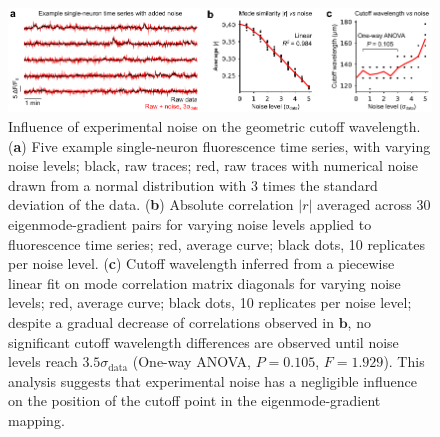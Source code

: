 \documentclass{article}
\begin{document}
\begin{figure}[t]
    \centering
    \includegraphics[width=1.0\linewidth]{figures/supp_noise.pdf}
    \caption{Influence of experimental noise on the geometric cutoff wavelength. (\textbf{a}) Five example single-neuron fluorescence time series, with varying noise levels; black, raw traces; red, raw traces with numerical noise drawn from a normal distribution with 3 times the standard deviation of the data. (\textbf{b}) Absolute correlation $|r|$ averaged across 30 eigenmode-gradient pairs for varying noise levels applied to fluorescence time series; red, average curve; black dots, 10 replicates per noise level. (\textbf{c}) Cutoff wavelength inferred from a piecewise linear fit on mode correlation matrix diagonals for varying noise levels; red, average curve; black dots, 10 replicates per noise level; despite a gradual decrease of correlations observed in $\textbf{b}$, no significant cutoff wavelength differences are observed until noise levels reach $3.5\sigma_{\text{data}}$ (One-way ANOVA, $P=0.105$, $F=1.929$). This analysis suggests that experimental noise has a negligible influence on the position of the cutoff point in the eigenmode-gradient mapping.}
    \label{supp_noise}
\end{figure}

\newpage
\end{document}
